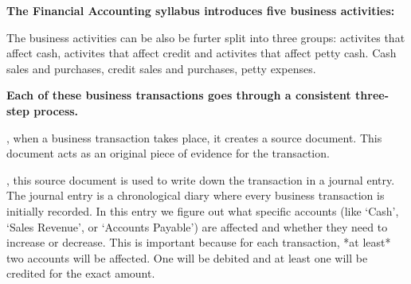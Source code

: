 
\scriptsize


    \textbf{The Financial Accounting syllabus introduces five business activities:}

  The business activities can be also be furter split into three groups: activites that affect cash, activites that affect credit and activites that affect petty cash. Cash sales and purchases, credit sales and purchases, petty expenses. 

  \textbf{Each of these business transactions goes through a consistent three-step process.}

  , when a business transaction takes place, it creates a source document. This document acts as an original piece of evidence for the transaction. 
     
  , this source document is used to write down the transaction in a journal entry. The journal entry is a chronological diary where every business transaction is initially recorded. In this entry we figure out what specific accounts (like `Cash', `Sales Revenue', or `Accounts Payable') are affected and whether they need to increase or decrease.  This is important because for each transaction, *at least* two accounts will be affected. One will be debited and at least one will be credited for the exact amount. 
     
